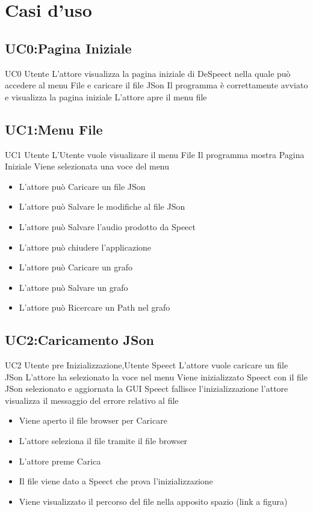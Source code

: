 \documentclass[../AnalisideiRequisiti.tex]{subfiles}
\begin{document}

	\chapter{Casi d'uso}
	\section{UC0:Pagina Iniziale}
	\UserCase
	{UC0}
	{Utente}
	{}
	{L'attore visualizza la pagina iniziale di DeSpeect nella quale può accedere al menu File e caricare il file JSon}
	{Il programma è correttamente avviato e visualizza la pagina iniziale}
	{L'attore apre il menu file}
	{}
	{}
	
	\section{UC1:Menu File}
	\UserCase
	{UC1}
	{Utente}
	{}
	{L'Utente vuole visualizare il menu File}
	{Il programma mostra Pagina Iniziale }
	{Viene selezionata una voce del menu}
	{}
	{	\begin{itemize}
		\item{} L'attore può Caricare un file JSon 
		\item{} L'attore può Salvare le modifiche al file JSon 
		\item{} L'attore può Salvare l'audio prodotto da Speect 
		\item{} L'attore può chiudere l'applicazione 
		\item{} L'attore può Caricare un grafo 
		\item{} L'attore può Salvare un grafo 
		\item{} L'attore può Ricercare un Path nel grafo 
		\end{itemize}
	}

	\section{UC2:Caricamento JSon}
	\UserCase
	{UC2}
	{Utente pre Inizializzazione,Utente}
	{Speect}
	{L'attore vuole caricare un file JSon}
	{L'attore ha selezionato la voce nel menu}
	{Viene inizializzato Speect con il file JSon selezionato e aggiornata la GUI}
	{Speect fallisce l'inizializzazione l'attore visualizza il messaggio del errore relativo al file }
	{
		\begin{itemize}
			\item{} Viene aperto il file browser per Caricare
			\item{} L'attore seleziona il file tramite il file browser 
			\item{} L'attore preme Carica
			\item{} Il file viene dato a Speect che prova l'inizializzazione
			\item{} Viene visualizzato il percorso del file nella apposito spazio (link a figura)
		\end{itemize}
	}
\end{document}
